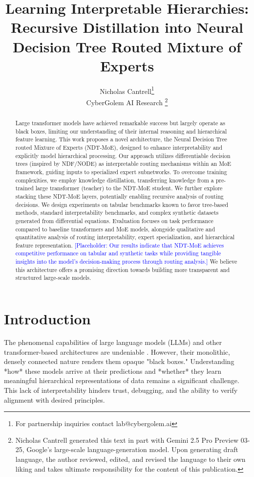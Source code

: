 \documentclass[11pt,a4paper]{article}
\title{Learning Interpretable Hierarchies: Recursive Distillation into Neural Decision Tree Routed Mixture of Experts}
\author{
  Nicholas Cantrell\thanks{For partnership inquiries contact lab@cybergolem.ai} \\
  CyberGolem AI Research \thanks{Nicholas Cantrell generated this text in part with Gemini 2.5 Pro Preview 03-25, Google's large-scale language-generation model. Upon generating draft language, the author reviewed, edited, and revised the language to their own liking and takes ultimate responsibility for the content of this publication.} \\
}
\date{} %
\newcommand{\placeholder}[1]{\textcolor{blue}{[Placeholder: #1]}}
\begin{document}
\maketitle

\begin{abstract}
Large transformer models have achieved remarkable success but largely operate as black boxes, limiting our understanding of their internal reasoning and hierarchical feature learning. This work proposes a novel architecture, the Neural Decision Tree routed Mixture of Experts (NDT-MoE), designed to enhance interpretability and explicitly model hierarchical processing. Our approach utilizes differentiable decision trees (inspired by NDF/NODE) as interpretable routing mechanisms within an MoE framework, guiding inputs to specialized expert subnetworks. To overcome training complexities, we employ knowledge distillation, transferring knowledge from a pre-trained large transformer (teacher) to the NDT-MoE student. We further explore stacking these NDT-MoE layers, potentially enabling recursive analysis of routing decisions. We design experiments on tabular benchmarks known to favor tree-based methods, standard interpretability benchmarks, and complex synthetic datasets generated from differential equations. Evaluation focuses on task performance compared to baseline transformers and MoE models, alongside qualitative and quantitative analysis of routing interpretability, expert specialization, and hierarchical feature representation. \placeholder{Our results indicate that NDT-MoE achieves competitive performance on tabular and synthetic tasks while providing tangible insights into the model's decision-making process through routing analysis.} We believe this architecture offers a promising direction towards building more transparent and structured large-scale models.
\end{abstract}

\section{Introduction}
\label{sec:introduction}

The phenomenal capabilities of large language models (LLMs) and other transformer-based architectures are undeniable \citep{vaswani2017attention, brown2020language}. However, their monolithic, densely connected nature renders them opaque "black boxes." Understanding *how* these models arrive at their predictions and *whether* they learn meaningful hierarchical representations of data remains a significant challenge. This lack of interpretability hinders trust, debugging, and the ability to verify alignment with desired principles.
\end{document}
